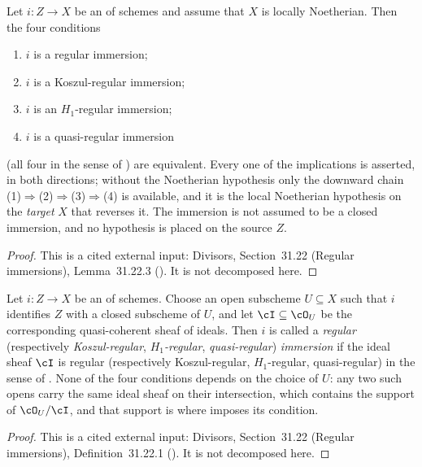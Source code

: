 \begin{lemma}
\label{lem:pc-regular-immersion-noetherian}
Let $i:Z\to X$ be an  of
schemes and assume that $X$ is locally Noetherian.  Then the four
conditions
\begin{enumerate}
\item $i$ is a regular immersion;
\item $i$ is a Koszul-regular immersion;
\item $i$ is an $H_1$-regular immersion;
\item $i$ is a quasi-regular immersion
\end{enumerate}
(all four in the sense of ) are equivalent.
Every one of the implications is asserted, in both directions; without the
Noetherian hypothesis only the downward chain
(1)$\Rightarrow$(2)$\Rightarrow$(3)$\Rightarrow$(4) is available, and it is
the local Noetherian hypothesis on the \emph{target} $X$ that reverses it.
The immersion is not assumed to be a closed immersion, and no hypothesis is
placed on the source $Z$.
\end{lemma}
\begin{proof}
This is a cited external input: Divisors, Section~31.22 (Regular
immersions), Lemma~31.22.3 ().  It is not decomposed
here.
\end{proof}

\begin{definition}
\label{def:pc-regular-immersion}
Let $i:Z\to X$ be an  of
schemes.  Choose an open subscheme $U\subseteq X$ such that $i$ identifies
$Z$ with a closed subscheme of $U$, and let $\cI\subseteq\cO_U$ be the
corresponding quasi-coherent sheaf of ideals.  Then $i$ is called a
\emph{regular} (respectively \emph{Koszul-regular}, \emph{$H_1$-regular},
\emph{quasi-regular}) \emph{immersion} if the ideal sheaf $\cI$ is regular
(respectively Koszul-regular, $H_1$-regular, quasi-regular) in the sense of
.  None of the four conditions depends on
the choice of $U$: any two such opens carry the same ideal sheaf on their
intersection, which contains the support of $\cO_U/\cI$, and that support
is where  imposes its condition.
\end{definition}
\begin{proof}
This is a cited external input: Divisors, Section~31.22 (Regular
immersions), Definition~31.22.1 ().  It is not
decomposed here.
\end{proof}

